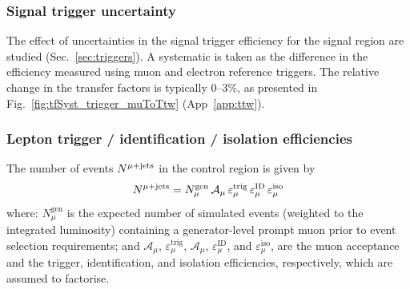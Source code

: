 \subsubsection{Signal trigger uncertainty}
\label{sec:tfSyst_trigger}

The effect of uncertainties in the signal trigger efficiency for the
signal region are studied (Sec.~\ref{sec:triggers}). A systematic is
taken as the difference in the efficiency measured using muon and
electron reference triggers.  The relative change in the transfer
factors is typically 0--3\%, as presented in
Fig.~\ref{fig:tfSyst_trigger_muToTtw} (App~\ref{app:ttw}).

\subsubsection{Lepton trigger / identification / isolation efficiencies}
\label{sec:leptonSyst}

The number of events $N^{\mu + \textrm{jets}}$ in the \mj control region is given by
\begin{equation}
  \label{eq:lepton_eff_mj}
  N^{\mu + \textrm{jets}} = 
  N^\textrm{gen}_\mu \,
  \mathcal{A}_\mu \,
  \varepsilon^\textrm{trig}_\mu \,
  \varepsilon^\textrm{ID}_\mu \,
  \varepsilon^\textrm{iso}_\mu  
\end{equation}
where: $N^\textrm{gen}_\mu$ is the expected number of simulated events
(weighted to the integrated luminosity) containing a generator-level
prompt muon prior to event selection requirements; and
$\mathcal{A}_\mu$, $\varepsilon^\textrm{trig}_\mu$,
$\mathcal{A}_\mu$, $\varepsilon^\textrm{ID}_\mu$, and
$\varepsilon^\textrm{iso}_\mu$, are the muon acceptance and the
trigger, identification, and isolation efficiencies, respectively,
which are assumed to factorise. 


